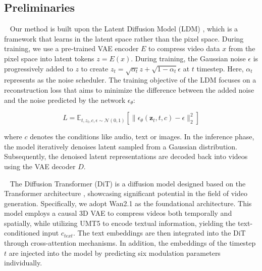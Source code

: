 \documentclass[sigconf]{acmart}
\begin{document}
\subsection{Preliminaries} \label{subsec:Preliminaries}
~ Our method is built upon the Latent Diffusion Model (LDM) , which is a framework that learns in the latent space rather than the pixel space. During training, we use a pre-trained VAE encoder $E$ to compress video data $x$ from the pixel space into latent tokens $z = E(x)$. During training, the Gaussian noise $\epsilon$ is progressively added to $z$ to create $z_t = \sqrt{\alpha_t} z + \sqrt{1 - \alpha_t} \epsilon$ at $t$ timestep. Here, $\alpha_t$ represents as the noise scheduler. The training objective of the LDM focuses on a reconstruction loss that aims to minimize the difference between the added noise and the noise predicted by the network $\epsilon_\theta$: 

\begin{equation}
    L = \mathbb{E}_{t, z_t, c, \epsilon \sim \mathcal{N}(0, 1)} \left[\|\epsilon_\theta(\mathbf{z}_t, t, c) - \epsilon\|_2^2\right]
    \label{eq:loss1}
\end{equation}

where $c$ denotes the conditions like audio, text or images. In the inference phase, the model iteratively denoises latent sampled from a Gaussian distribution. Subsequently, the denoised latent representations are decoded back into videos using the VAE decoder $D$.

~ The Diffusion Transformer (DiT) \cite{peebles2023scalable} is a diffusion model designed based on the Transformer architecture \cite{vaswani2017attention}, showcasing significant potential in the field of video generation. Specifically, we adopt Wan2.1 \cite{wan2.1} as the foundational architecture. This model employs a causal 3D VAE to compress videos both temporally and spatially, while utilizing UMT5 \cite{chung2023unimax} to encode textual information, yielding the text-conditioned input $c_{text}$. The text embeddings are then integrated into the DiT through cross-attention mechanisms. In addition, the embeddings of the timestep $t$ are injected into the model by predicting six modulation parameters individually.
\end{document}
